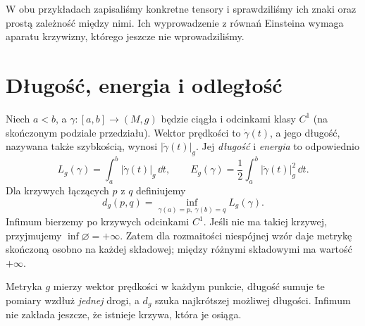 W obu przykładach zapisaliśmy konkretne tensory
i sprawdziliśmy ich znaki oraz prostą zależność
między nimi. Ich wyprowadzenie z równań Einsteina
wymaga aparatu krzywizny, którego jeszcze nie
wprowadziliśmy.

\section{Długość, energia i odległość}
\label{sec:metryka-dlugosc-energia}

\begin{definicja}
\label{def:dlugosc-energia}
Niech $a<b$, a $\gamma:[a,b]\to(M,g)$ będzie ciągła
i odcinkami klasy $C^1$ (na skończonym podziale przedziału).
Wektor prędkości to $\dot\gamma(t)$, a jego długość,
nazywana także szybkością, wynosi $|\dot\gamma(t)|_g$.
Jej \emph{długość} i
\emph{energia} to odpowiednio
\begin{equation}\label{eq:dlugosc-energia}
 L_g(\gamma)=\int_a^b|\dot\gamma(t)|_g\,\dd t,
 \qquad
 E_g(\gamma)=\frac12\int_a^b
                  |\dot\gamma(t)|_g^2\,\dd t.
\end{equation}
Dla krzywych łączących $p$ z $q$ definiujemy
\begin{equation}\label{eq:odleglosc-riemannowska}
 d_g(p,q)=\inf_{\gamma(a)=p,\ \gamma(b)=q}
                 L_g(\gamma).
\end{equation}
Infimum bierzemy po krzywych odcinkami $C^1$.
Jeśli nie ma takiej krzywej, przyjmujemy $\inf\varnothing=+\infty$.
Zatem dla rozmaitości niespójnej wzór daje metrykę
skończoną osobno na każdej składowej; między różnymi
składowymi ma wartość $+\infty$.
\end{definicja}

Metryka $g$ mierzy wektor prędkości w każdym
punkcie, długość sumuje te pomiary wzdłuż
\emph{jednej} drogi, a $d_g$ szuka najkrótszej
możliwej długości. Infimum nie zakłada jeszcze,
że istnieje krzywa, która je osiąga.

